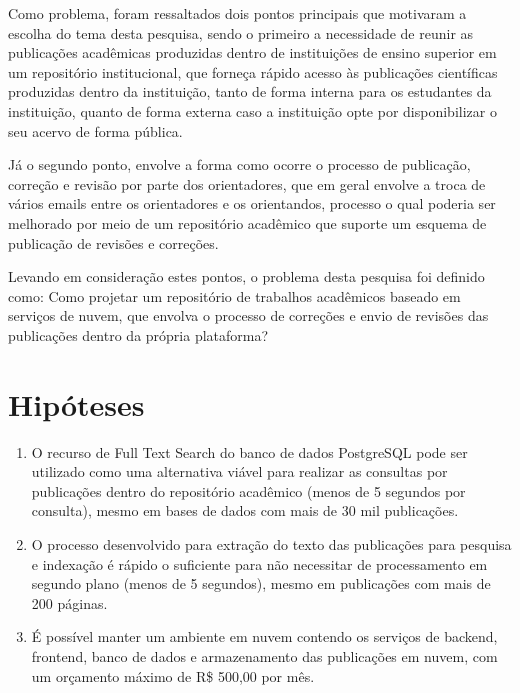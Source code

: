 Como problema, foram ressaltados dois pontos principais que motivaram a
escolha do tema desta pesquisa, sendo o primeiro a necessidade de reunir
as publicações acadêmicas produzidas dentro de instituições de ensino
superior em um repositório institucional, que forneça rápido acesso às
publicações científicas produzidas dentro da instituição, tanto de forma
interna para os estudantes da instituição, quanto de forma externa caso
a instituição opte por disponibilizar o seu acervo de forma pública.

Já o segundo ponto, envolve a forma como ocorre o processo de publicação,
correção e revisão por parte dos orientadores, que em geral envolve a
troca de vários emails entre os orientadores e os orientandos,
processo o qual poderia ser melhorado por meio de um repositório
acadêmico que suporte um esquema de publicação de revisões e correções.

Levando em consideração estes pontos, o problema desta pesquisa
foi definido como: Como projetar um repositório de trabalhos
acadêmicos baseado em serviços de nuvem, que envolva o processo
de correções e envio de revisões das publicações dentro
da própria plataforma?

\section{Hipóteses} \label{sec::Hypothesis}
\begin{enumerate}
      \item O recurso de Full Text Search do banco de dados PostgreSQL
            pode ser utilizado como uma alternativa viável para realizar
            as consultas por publicações dentro do repositório acadêmico
            (menos de 5 segundos por consulta), mesmo em bases de dados
            com mais de 30 mil publicações.

      \item O processo desenvolvido para extração do texto das publicações
            para pesquisa e indexação é rápido o suficiente para não
            necessitar de processamento em segundo plano (menos de 5 segundos),
            mesmo em publicações com mais de 200 páginas.

      \item É possível manter um ambiente em nuvem contendo os serviços
            de backend, frontend, banco de dados e armazenamento das
            publicações em nuvem, com um orçamento máximo de R\$ 500,00
            por mês.

\end{enumerate}


